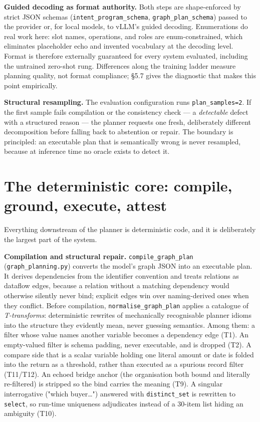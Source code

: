 \documentclass[10pt]{article} %
\begin{document}
\textbf{Guided decoding as format authority.} Both steps are shape-enforced by strict JSON schemas (\texttt{intent\_program\_schema}, \texttt{graph\_plan\_schema}) passed to the provider or, for local models, to vLLM's guided decoding. Enumerations do real work here: slot names, operations, and roles are enum-constrained, which eliminates placeholder echo and invented vocabulary at the decoding level. Format is therefore externally guaranteed for every system evaluated, including the untrained zero-shot rung. Differences along the training ladder measure planning quality, not format compliance; \S5.7 gives the diagnostic that makes this point empirically.

\textbf{Structural resampling.} The evaluation configuration runs \texttt{plan\_samples=2}. If the first sample fails compilation or the consistency check --- a \emph{detectable} defect with a structured reason --- the planner requests one fresh, deliberately different decomposition before falling back to abstention or repair. The boundary is principled: an executable plan that is semantically wrong is never resampled, because at inference time no oracle exists to detect it.

\section{The deterministic core: compile, ground, execute, attest}\label{sec:the-deterministic-core-compile-ground-ex}

Everything downstream of the planner is deterministic code, and it is deliberately the largest part of the system.

\textbf{Compilation and structural repair.} \texttt{compile\_graph\_plan} (\texttt{graph\_planning.py}) converts the model's graph JSON into an executable plan. It derives dependencies from the identifier convention and treats relations as dataflow edges, because a relation without a matching dependency would otherwise silently never bind; explicit edges win over naming-derived ones when they conflict. Before compilation, \texttt{normalise\_graph\_plan} applies a catalogue of \emph{T-transforms}: deterministic rewrites of mechanically recognisable planner idioms into the structure they evidently mean, never guessing semantics. Among them: a filter whose value names another variable becomes a dependency edge (T1). An empty-valued filter is schema padding, never executable, and is dropped (T2). A compare side that is a scalar variable holding one literal amount or date is folded into the return as a threshold, rather than executed as a spurious record filter (T11/T12). An echoed bridge anchor (the organisation both bound and literally re-filtered) is stripped so the bind carries the meaning (T9). A singular interrogative ("which buyer\ldots{}") answered with \texttt{distinct\_set} is rewritten to \texttt{select}, so run-time uniqueness adjudicates instead of a 30-item list hiding an ambiguity (T10).
\end{document}
